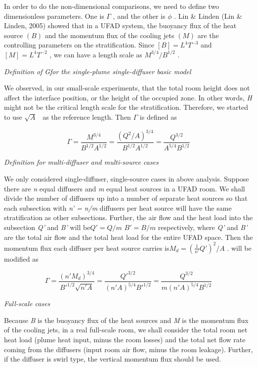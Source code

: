 In order to do the non-dimensional comparisons, we need to define two dimensionless parameters. One is \(\Gamma\) , and the other is \(\phi\) . Lin \& Linden (Lin \& Linden, 2005) showed that in a UFAD system, the buoyancy flux of the heat source \((B)\) and the momentum flux of the cooling jets \((M)\) are the controlling parameters on the stratification. Since \([B] = {L^4}{T^{ - 3}}\) and\([M] = {L^4}{T^{ - 2}}\) , we can have a length scale as \({M^{3/4}}/{B^{1/2}}\) .

\emph{Definition of} \emph{Gfor the single-plume single-diffuser basic model}

We observed, in our small-scale experiments, that the total room height does not affect the interface position, or the height of the occupied zone. In other words, \emph{H} might not be the critical length scale for the stratification. Therefore, we started to use \(\sqrt A\) ~as the reference length. Then \(\Gamma\) is defined as

\begin{equation}
\Gamma  = \frac{{{M^{3/4}}}}{{{B^{1/2}}{A^{1/2}}}} = \frac{{{{({Q^2}/A)}^{3/4}}}}{{{B^{1/2}}{A^{1/2}}}} = \frac{{{Q^{3/2}}}}{{{A^{5/4}}{B^{1/2}}}}
\end{equation}

\emph{Definition for multi-diffuser and multi-source cases}

We only considered single-diffuser, single-source cases in above analysis. Suppose there are \emph{n} equal diffusers and \emph{m} equal heat sources in a UFAD room. We shall divide the number of diffusers up into a number of separate heat sources so that each subsection with \emph{n' = n/m} diffusers per heat source will have the same stratification as other subsections. Further, the air flow and the heat load into the subsection \emph{Q'} and \emph{B'} will be\(Q' = Q/m\) \(B' = B/m\) respectively, where \emph{Q'} and \emph{B'} are the total air flow and the total heat load for the entire UFAD space. Then the momentum flux each diffuser per heat source carries is\({M_d} = {(\frac{1}{{n'}}Q')^2}/A\) . will be modified as

\begin{equation}
\Gamma  = \frac{{{{(n'{M_d})}^{3/4}}}}{{B{'^{1/2}}\sqrt {n'A} }} = \frac{{Q{'^{3/2}}}}{{{{(n'A)}^{5/4}}B{'^{1/2}}}} = \frac{{{Q^{3/2}}}}{{m{{(n'A)}^{5/4}}{B^{1/2}}}}
\end{equation}

\emph{Full-scale cases}

Because \emph{B} is the buoyancy flux of the heat sources and \emph{M} is the momentum flux of the cooling jets, in a real full-scale room, we shall consider the total room net heat load (plume heat input, minus the room losses) and the total net flow rate coming from the diffusers (input room air flow, minus the room leakage). Further, if the diffuser is swirl type, the vertical momentum flux should be used.

